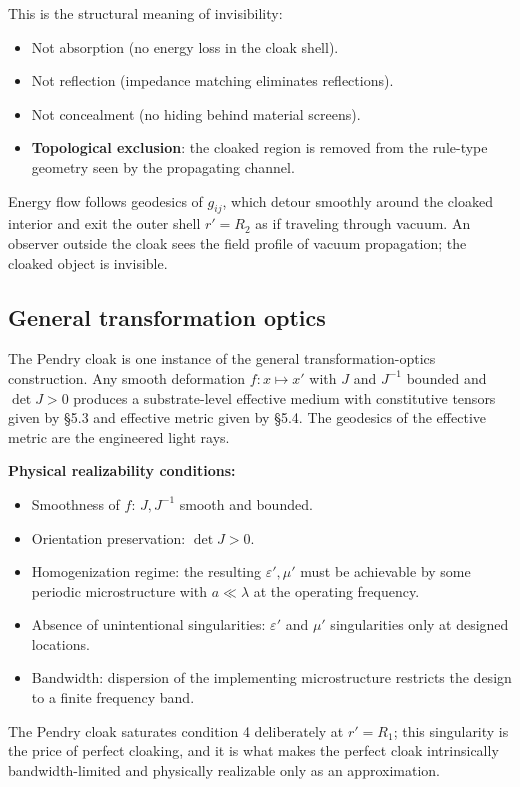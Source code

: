 \documentclass[11pt,a4paper]{article}
\begin{document}
This is the structural meaning of invisibility:
\begin{itemize}[noitemsep]
\item Not absorption (no energy loss in the cloak shell).
\item Not reflection (impedance matching eliminates reflections).
\item Not concealment (no hiding behind material screens).
\item \textbf{Topological exclusion}: the cloaked region is removed from the rule-type geometry seen by the propagating channel.
\end{itemize}

Energy flow follows geodesics of $g_{ij}$, which detour smoothly around the cloaked interior and exit the outer shell $r' = R_2$ as if traveling through vacuum. An observer outside the cloak sees the field profile of vacuum propagation; the cloaked object is invisible.

\subsection{General transformation optics}

The Pendry cloak is one instance of the general transformation-optics construction. Any smooth deformation $f: x \mapsto x'$ with $J$ and $J^{-1}$ bounded and $\det J > 0$ produces a substrate-level effective medium with constitutive tensors given by \S5.3 and effective metric given by \S5.4. The geodesics of the effective metric are the engineered light rays.

\textbf{Physical realizability conditions:}
\begin{itemize}[noitemsep]
\item Smoothness of $f$: $J, J^{-1}$ smooth and bounded.
\item Orientation preservation: $\det J > 0$.
\item Homogenization regime: the resulting $\varepsilon', \mu'$ must be achievable by some periodic microstructure with $a \ll \lambda$ at the operating frequency.
\item Absence of unintentional singularities: $\varepsilon'$ and $\mu'$ singularities only at designed locations.
\item Bandwidth: dispersion of the implementing microstructure restricts the design to a finite frequency band.
\end{itemize}

The Pendry cloak saturates condition 4 deliberately at $r' = R_1$; this singularity is the price of perfect cloaking, and it is what makes the perfect cloak intrinsically bandwidth-limited and physically realizable only as an approximation.
\end{document}
